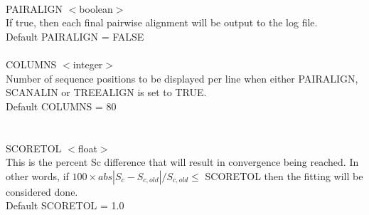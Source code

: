     \\
    PAIRALIGN $<$boolean$>$\\
    If true, then each final pairwise alignment will be output to the
    log file.\\
    Default PAIRALIGN = FALSE\\
    \\
    COLUMNS $<$integer$>$\\
    Number of sequence positions to be displayed per line when either
    PAIRALIGN, SCANALIN or TREEALIGN is set to TRUE.\\
    Default COLUMNS = 80\\
    \\
    \\
    SCORETOL $<$float$>$ \\
    This is the percent Sc difference that will result in convergence
    being reached.  In other words, if $100 \times abs | S_{c} - S_{c,old} |/S_{c,old} \leq$ SCORETOL then
    the fitting will be considered done.\\
    Default SCORETOL = 1.0\\
    \\

